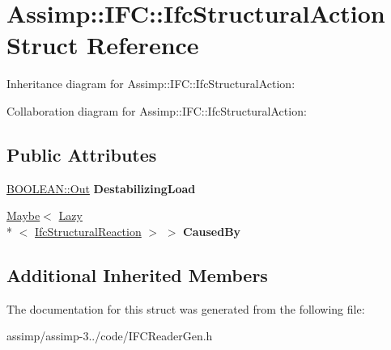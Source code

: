 \hypertarget{struct_assimp_1_1_i_f_c_1_1_ifc_structural_action}{\section{Assimp\+:\+:I\+F\+C\+:\+:Ifc\+Structural\+Action Struct Reference}
\label{struct_assimp_1_1_i_f_c_1_1_ifc_structural_action}
}


Inheritance diagram for Assimp\+:\+:I\+F\+C\+:\+:Ifc\+Structural\+Action\+:


Collaboration diagram for Assimp\+:\+:I\+F\+C\+:\+:Ifc\+Structural\+Action\+:
\subsection*{Public Attributes}
\begin{DoxyCompactItemize}
\item 
\hypertarget{struct_assimp_1_1_i_f_c_1_1_ifc_structural_action_a1ea84978499a65d964dd879b775528ce}{\hyperlink{classboost_1_1shared__ptr}{B\+O\+O\+L\+E\+A\+N\+::\+Out} {\bfseries Destabilizing\+Load}}\label{struct_assimp_1_1_i_f_c_1_1_ifc_structural_action_a1ea84978499a65d964dd879b775528ce}

\item 
\hypertarget{struct_assimp_1_1_i_f_c_1_1_ifc_structural_action_a7073dee430062659d6f7afbf5e0ce976}{\hyperlink{struct_assimp_1_1_s_t_e_p_1_1_maybe}{Maybe}$<$ \hyperlink{struct_assimp_1_1_s_t_e_p_1_1_lazy}{Lazy}\\*
$<$ \hyperlink{struct_assimp_1_1_i_f_c_1_1_ifc_structural_reaction}{Ifc\+Structural\+Reaction} $>$ $>$ {\bfseries Caused\+By}}\label{struct_assimp_1_1_i_f_c_1_1_ifc_structural_action_a7073dee430062659d6f7afbf5e0ce976}

\end{DoxyCompactItemize}
\subsection*{Additional Inherited Members}


The documentation for this struct was generated from the following file\+:\begin{DoxyCompactItemize}
\item 
assimp/assimp-\/3../code/I\+F\+C\+Reader\+Gen.\+h\end{DoxyCompactItemize}
